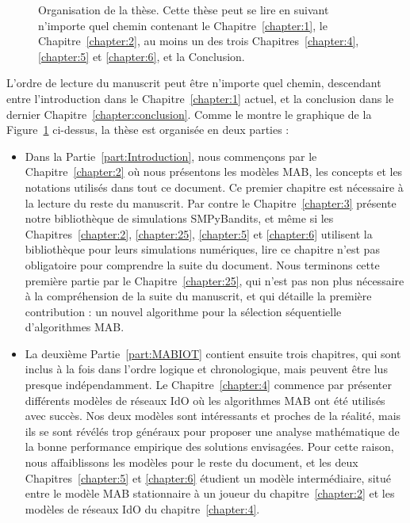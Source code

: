 \begin{resume_fr}
\begin{figure}[h!]
{
    }
    \caption[Organisation de la thèse : une carte de lecture]{Organisation de la thèse. Cette thèse peut se lire en suivant n'importe quel chemin contenant le Chapitre~\ref{chapter:1}, le Chapitre~\ref{chapter:2}, au moins un des trois Chapitres~\ref{chapter:4}, \ref{chapter:5} et \ref{chapter:6}, et la Conclusion.}
    \label{fig:1:organization_fr}
\end{figure}

L'ordre de lecture du manuscrit peut être n'importe quel chemin, descendant entre l'introduction dans le Chapitre~\ref{chapter:1} actuel, et la conclusion dans le dernier Chapitre~\ref{chapter:conclusion}.
Comme le montre le graphique de la Figure~\ref{fig:1:organization_fr} ci-dessus,
la thèse est organisée en deux parties :

\begin{itemize}
    \item
Dans la Partie~\ref{part:Introduction}, nous commençons par le Chapitre~\ref{chapter:2} où nous présentons les modèles MAB, les concepts et les notations utilisés dans tout ce document. Ce premier chapitre est nécessaire à la lecture du reste du manuscrit.
Par contre le Chapitre~\ref{chapter:3} présente notre bibliothèque de simulations SMPyBandits, et même si les Chapitres~\ref{chapter:2}, \ref{chapter:25}, \ref{chapter:5} et \ref{chapter:6} utilisent la bibliothèque pour leurs simulations numériques, lire ce chapitre n'est pas obligatoire pour comprendre la suite du document.
Nous terminons cette première partie par le Chapitre~\ref{chapter:25}, qui n'est pas non plus nécessaire à la compréhension de la suite du manuscrit, et qui détaille la première contribution : un nouvel algorithme pour la sélection séquentielle d'algorithmes MAB.

    \item
La deuxième Partie~\ref{part:MABIOT} contient ensuite trois chapitres, qui sont inclus à la fois dans l'ordre logique et chronologique, mais peuvent être lus presque indépendamment.
Le Chapitre~\ref{chapter:4} commence par présenter différents modèles de réseaux IdO où les algorithmes MAB ont été utilisés avec succès. Nos deux modèles sont intéressants et proches de la réalité, mais ils se sont révélés trop généraux pour proposer une analyse mathématique de la bonne performance empirique des solutions envisagées.
Pour cette raison, nous affaiblissons les modèles pour le reste du document,
et les deux Chapitres~\ref{chapter:5} et \ref{chapter:6} étudient un modèle intermédiaire, situé entre le modèle MAB stationnaire à un joueur du chapitre~\ref{chapter:2} et les modèles de réseaux IdO du chapitre~\ref{chapter:4}.
\end{itemize}



\end{resume_fr}
